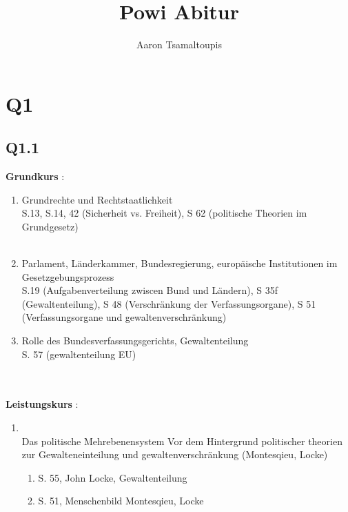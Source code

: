 \documentclass[12pt, letterpaper]{article}
\title{Powi Abitur}
\author{Aaron Tsamaltoupis}
\begin{document}
\maketitle
\tableofcontents
\newpage
\newpage
\section{Q1}
\subsection{Q1.1}
\label{sec:Q1.1}

\label{sec:Q1}
\textbf{Grundkurs} :\\
\begin{enumerate}
  
  \item Grundrechte und Rechtstaatlichkeit\\S.13, S.14, 42 (Sicherheit vs. Freiheit), S 62 (politische Theorien im Grundgesetz)\\\\
  \item Parlament, Länderkammer, Bundesregierung, europäische Institutionen im Gesetzgebungsprozess\\ S.19 (Aufgabenverteilung zwiscen Bund und Ländern), S 35f (Gewaltenteilung), 
    S 48 (Verschränkung der Verfassungsorgane), S 51 (Verfassungsorgane und gewaltenverschränkung)
  \item Rolle des Bundesverfassungsgerichts, Gewaltenteilung\\
    S. 57 (gewaltenteilung EU)

\end{enumerate}
\\\\
\textbf{Leistungskurs} :
\begin{enumerate}
  
  \item \\Das politische Mehrebenensystem Vor dem Hintergrund politischer theorien zur Gewalteneinteilung und gewaltenverschränkung (Montesqieu, Locke)\\ 
\begin{enumerate}
  \item S. 55, John Locke, Gewaltenteilung
  \item S. 51, Menschenbild Montesqieu, Locke
\end{enumerate}
\end{enumerate}
\\\\
\end{document}
